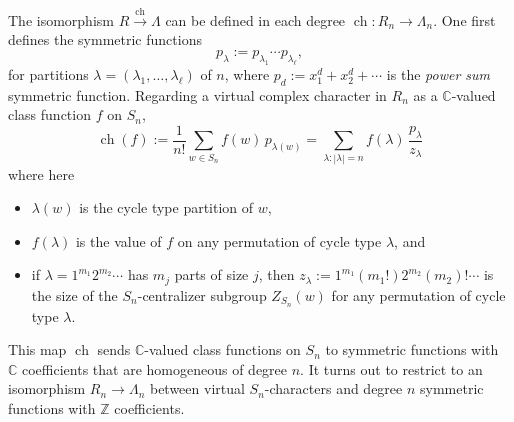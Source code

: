 \documentclass[12pt]{amsart}
\theoremstyle{plain}
\theoremstyle{definition}
\begin{document}
The isomorphism 
$
R \overset{{\operatorname{ch}}}{\longrightarrow} \Lambda
$
can be defined in each degree
${{\operatorname{ch}}}: R_n \rightarrow \Lambda_n$.  One first defines 
the symmetric functions
$$
p_\lambda:=p_{\lambda_1} \cdots p_{\lambda_\ell},
$$
for partitions $\lambda=(\lambda_1,\ldots,\lambda_\ell)$ of $n$,
where $p_d:=x_1^d+x_2^d+\cdots$ is the {\it power sum} symmetric function.
Regarding a virtual complex character in $R_n$ as a ${{\mathbb C}}$-valued class function 
$f$ on $S_n$,
\begin{equation}
\label{ch-definition}
{{\operatorname{ch}}}(f):=\frac{1}{n!} \sum_{w \in S_n} f(w) \, p_{\lambda(w)}
=\sum_{\lambda: |\lambda|=n} f(\lambda) \, \frac{p_\lambda}{z_\lambda}
\end{equation}
where here 
\begin{itemize}
\item 
$\lambda(w)$ is the cycle type partition of $w$,
\item
$f(\lambda)$ is the value of $f$ on any permutation of cycle type $\lambda$,
and 
\item if $\lambda=1^{m_1} 2^{m_2} \cdots $ has $m_j$ parts of size $j$, then $z_\lambda:=1^{m_1} (m_1 ! ) 2^{m_2} (m_2)! \cdots$ is the size of the
$S_n$-centralizer subgroup $Z_{S_n}(w)$ for any permutation of cycle type $\lambda$.
\end{itemize}
This map ${{\operatorname{ch}}}$ sends ${{\mathbb C}}$-valued class functions on $S_n$ to symmetric functions
with ${{\mathbb C}}$ coefficients that are homogeneous of degree $n$.  It turns out to restrict to an isomorphism $R_n \rightarrow \Lambda_n$ between virtual $S_n$-characters and
degree $n$ symmetric functions with ${{\mathbb{Z}}}$ coefficients.
\end{document}
